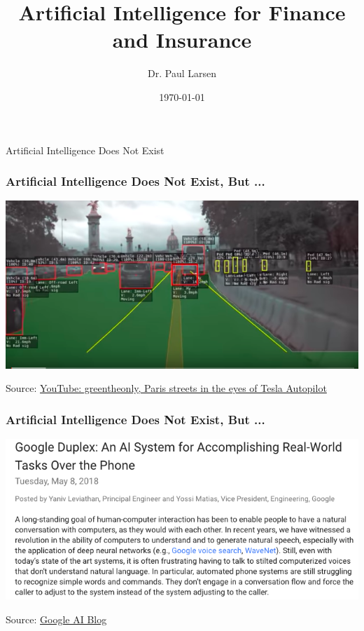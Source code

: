 \documentclass[xcolor=dvipsnames]{beamer}
\title{Artificial Intelligence for Finance and Insurance}
\author{Dr. Paul Larsen}
\date{\today}
\begin{document}
\maketitle

\begin{frame}[c]
\begin{center}
\huge Artificial Intelligence Does Not Exist
\end{center}
\end{frame}

\begin{frame}
\frametitle{Artificial Intelligence Does Not Exist, But ...}
\includegraphics[width=\textwidth]{figures/tesla_paris}

Source: \href{https://www.youtube.com/watch?v=_1MHGUC_BzQs}{YouTube: greentheonly, Paris streets in the eyes of Tesla Autopilot}
\end{frame}

\begin{frame}
\frametitle{Artificial Intelligence Does Not Exist, But ...}
\includegraphics[width=\textwidth]{figures/google_duplex}

Source: \href{https://ai.googleblog.com/2018/05/duplex-ai-system-for-natural-conversation.html}{Google AI Blog}
\end{frame}
\end{document}
